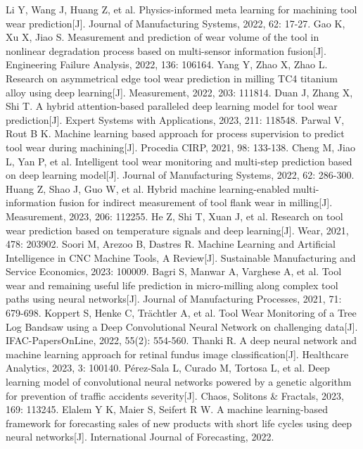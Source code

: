 % 
\begin{thebibliography}{99}
\small
{} Li Y, Wang J, Huang Z, et al. Physics-informed meta learning for machining tool wear prediction[J]. Journal of Manufacturing Systems, 2022, 62: 17-27.
% 
 Gao K, Xu X, Jiao S. Measurement and prediction of wear volume of the tool in nonlinear degradation process based on multi-sensor information fusion[J]. Engineering Failure Analysis, 2022, 136: 106164.
% 
 Yang Y, Zhao X, Zhao L. Research on asymmetrical edge tool wear prediction in milling TC4 titanium alloy using deep learning[J]. Measurement, 2022, 203: 111814.
% 
 Duan J, Zhang X, Shi T. A hybrid attention-based paralleled deep learning model for tool wear prediction[J]. Expert Systems with Applications, 2023, 211: 118548.
% 
 Parwal V, Rout B K. Machine learning based approach for process supervision to predict tool wear during machining[J]. Procedia CIRP, 2021, 98: 133-138.
% 
 Cheng M, Jiao L, Yan P, et al. Intelligent tool wear monitoring and multi-step prediction based on deep learning model[J]. Journal of Manufacturing Systems, 2022, 62: 286-300.
% 
 Huang Z, Shao J, Guo W, et al. Hybrid machine learning-enabled multi-information fusion for indirect measurement of tool flank wear in milling[J]. Measurement, 2023, 206: 112255.
% 
 He Z, Shi T, Xuan J, et al. Research on tool wear prediction based on temperature signals and deep learning[J]. Wear, 2021, 478: 203902.
% 
 Soori M, Arezoo B, Dastres R. Machine Learning and Artificial Intelligence in CNC Machine Tools, A Review[J]. Sustainable Manufacturing and Service Economics, 2023: 100009.
% 
 Bagri S, Manwar A, Varghese A, et al. Tool wear and remaining useful life prediction in micro-milling along complex tool paths using neural networks[J]. Journal of Manufacturing Processes, 2021, 71: 679-698.
% 
 Koppert S, Henke C, Trächtler A, et al. Tool Wear Monitoring of a Tree Log Bandsaw using a Deep Convolutional Neural Network on challenging data[J]. IFAC-PapersOnLine, 2022, 55(2): 554-560.
% 
 Thanki R. A deep neural network and machine learning approach for retinal fundus image classification[J]. Healthcare Analytics, 2023, 3: 100140.
% 
 Pérez-Sala L, Curado M, Tortosa L, et al. Deep learning model of convolutional neural networks powered by a genetic algorithm for prevention of traffic accidents severity[J]. Chaos, Solitons \& Fractals, 2023, 169: 113245.
% 
 Elalem Y K, Maier S, Seifert R W. A machine learning-based framework for forecasting sales of new products with short life cycles using deep neural networks[J]. International Journal of Forecasting, 2022.

\end{thebibliography}
